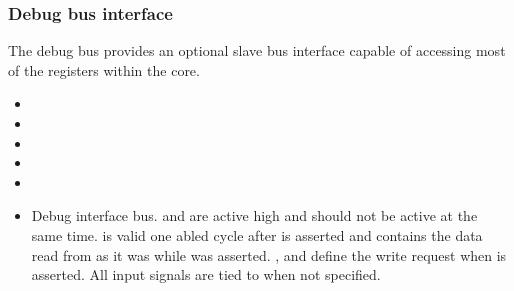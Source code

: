 
\subsubsection{Debug bus interface}
\label{sec:core-ug-cfg-inst-iface-debug}

The debug bus provides an optional slave bus interface capable of accessing most of the registers within the core.

\begin{itemize}
  
\item {}
\item {}
\item {}
\item {}
\item {}
\item {}

Debug interface bus.  and  are 
active high and should not be active at the same time.  is 
valid one abled cycle after  is asserted and 
contains the data read from  as it was while 
 was asserted. , 
 and  define the write request when 
 is asserted. All input signals are tied to  
when not specified.

\end{itemize}

